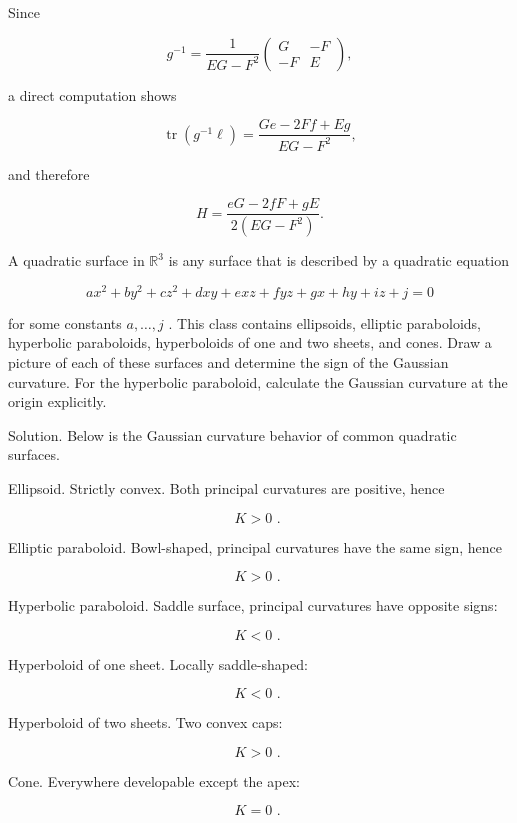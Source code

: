 \documentclass[10pt]{article}
\begin{document}
Since

\[
{g}^{-1} = \frac{1}{{EG} - {F}^{2}}\left( \begin{matrix} G &  - F \\   - F & E \end{matrix}\right) ,
\]

a direct computation shows

\[
\operatorname{tr}\left( {{g}^{-1}\ell }\right)  = \frac{{Ge} - {2Ff} + {Eg}}{{EG} - {F}^{2}},
\]

and therefore

\[
H = \frac{{eG} - {2fF} + {gE}}{2\left( {{EG} - {F}^{2}}\right) }.
\]

\begin{problem}[title=PROBLEM 2 (6 POINTS)]
A quadratic surface in \({\mathbb{R}}^{3}\) is any surface that is described by a quadratic equation

\[
a{x}^{2} + b{y}^{2} + c{z}^{2} + {dxy} + {exz} + {fyz} + {gx} + {hy} + {iz} + j = 0
\]

for some constants \(a,\ldots ,j\) . This class contains ellipsoids, elliptic paraboloids, hyperbolic paraboloids, hyperboloids of one and two sheets, and cones. Draw a picture of each of these surfaces and determine the sign of the Gaussian curvature. For the hyperbolic paraboloid, calculate the Gaussian curvature at the origin explicitly.
\end{problem}

Solution. Below is the Gaussian curvature behavior of common quadratic surfaces.

Ellipsoid. Strictly convex. Both principal curvatures are positive, hence

\[
K > 0\text{ . }
\]

Elliptic paraboloid. Bowl-shaped, principal curvatures have the same sign, hence

\[
K > 0\text{ . }
\]

Hyperbolic paraboloid. Saddle surface, principal curvatures have opposite signs:

\[
K < 0\text{ . }
\]

Hyperboloid of one sheet. Locally saddle-shaped:

\[
K < 0\text{ . }
\]

Hyperboloid of two sheets. Two convex caps:

\[
K > 0\text{ . }
\]

Cone. Everywhere developable except the apex:

\[
K = 0\text{ . }
\]
\end{document}
